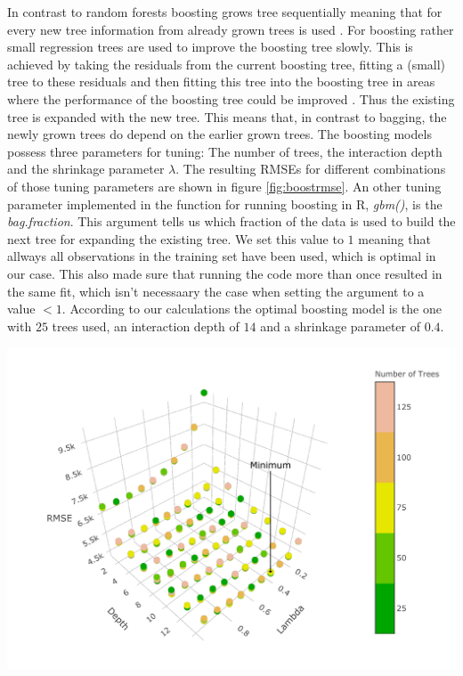 \documentclass[11pt,]{article}
\let\origfigure\figure
\let\endorigfigure\endfigure
\renewenvironment{figure}[1][2] {
    \expandafter\origfigure\expandafter[H]
} {
    \endorigfigure
}
\begin{document}
In contrast to random forests boosting grows tree sequentially meaning
that for every new tree information from already grown trees is used
\autocite[cf.][p. 322]{James2014}. For boosting rather small regression
trees are used to improve the boosting tree slowly. This is achieved by
taking the residuals from the current boosting tree, fitting a (small)
tree to these residuals and then fitting this tree into the boosting
tree in areas where the performance of the boosting tree could be
improved \autocite[cf.][p. 322]{James2014}. Thus the existing tree is
expanded with the new tree. This means that, in contrast to bagging, the
newly grown trees do depend on the earlier grown trees. The boosting
models possess three parameters for tuning: The number of trees, the
interaction depth and the shrinkage parameter \(\lambda\). The resulting
\ac{RMSE}s for different combinations of those tuning parameters are
shown in figure \ref{fig:boostrmse}. An other tuning parameter
implemented in the function for running boosting in R, \emph{gbm()}, is
the \emph{bag.fraction}. This argument tells us which fraction of the
data is used to build the next tree for expanding the existing tree. We
set this value to \(1\) meaning that allways all observations in the
training set have been used, which is optimal in our case. This also
made sure that running the code more than once resulted in the same fit,
which isn't necessaary the case when setting the argument to a value
\(< 1\). According to our calculations the optimal boosting model is the
one with \(25\) trees used, an interaction depth of \(14\) and a
shrinkage parameter of \(0.4\).

\begin{figure}

{\centering \includegraphics{../00_data/output_paper/11_boosting_plot} 

}

\caption[RMSEs of the Boosting Model for Different Parameters]{\label{fig:boostrmse}Boosting: Dependency between RMSE, Lambda, the Depths and the Number of Trees that are Grown.}\label{fig:boosting_hyper}
\end{figure}
\end{document}
